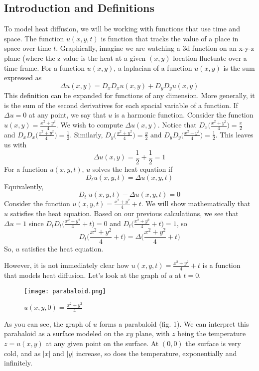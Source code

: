 \documentclass[12pt]{article}
\theoremstyle{plain}
\theoremstyle{definition}
\theoremstyle{remark}
\begin{document}
\subsection*{Introduction and Definitions}
To model heat diffusion, we will be working with functions that use time and space. The function $u(x, y, t)$ is function that tracks the value of a place in space over time $t$. Graphically, imagine we are watching a 3d function on an x-y-z plane (where the z value is the heat at a given $(x, y)$ location fluctuate over a time frame. 
 For a function $u(x, y)$, a laplacian of a function $u(x, y)$  is the sum expressed as
$$\Delta u(x, y) = D_xD_xu(x, y) + D_yD_yu(x, y)$$
This definition can be expanded for functions of any dimension. More generally, it is the sum of the second derivatives for each spacial variable of a function. If $\Delta u = 0$ at any point, we say that $u$ is a harmonic function. 
\example Consider the function $u(x, y) = \frac{x^2+y^2}{4}$. We wish to compute $\Delta u(x, y).$ Notice that $D_x \big(\frac{x^2+y^2}{4}\big) = \frac{x}{2}$ and $D_xD_x\big(\frac{x^2+y^2}{4}\big)=\frac{1}{2}$. Similarly, $D_y \big(\frac{x^2+y^2}{4}\big) = \frac{y}{2}$ and $D_yD_y\big(\frac{x^2+y^2}{4}\big) =\frac{1}{2}$. This leaves us with $$\Delta u(x, y) = \frac{1}{2} + \frac{1}{2} = 1$$
 For a function $u(x, y, t)$,  $u$ solves the heat equation if 
$$D_t u(x, y, t) = \Delta u(x, y, t)$$
Equivalently,
$$D_t\; u(x, y, t) -\Delta u(x, y, t) = 0$$
\example Consider the function $u(x, y, t) = \frac{x^2+y^2}{4} + t$. We will show mathematically that $u$ satisfies the heat equation.
Based on our previous calculations, we see that $\Delta u = 1$ since $D_tD_t \big(\frac{x^2+y^2}{4} + t\big) = 0$ and $D_t \big(\frac{x^2+y^2}{4} + t\big) =1$, so $$D_t \Big(\frac{x^2+y^2}{4} + t\Big) = \Delta \Big(\frac{x^2+y^2}{4} + t \Big)$$
So, $u$ satisfies the heat equation. 

However, it is not immediately clear how $u(x, y, t) = \frac{x^2+y^2}{4} + t$ is a function that models heat diffusion. Let's look at the graph of $u$ at $t=0$. 
\begin{figure}[ht]
\caption{$u(x, y, 0) = \frac{x^2+y^2}{4}$}
\centering
\texttt{[image: parabaloid.png]}

\end{figure}
As you can see, the graph of $u$ forms a parabaloid (fig. 1). We can interpret this parabaloid as a surface modeled on the  $x y$ plane, with $z$ being the temperature $z=u(x, y)$ at any given point on the surface. 
At $(0, 0)$ the surface is very cold, and as $|x|$ and $|y|$ increase, so does the temperature, exponentially and infinitely. 
\end{document}

